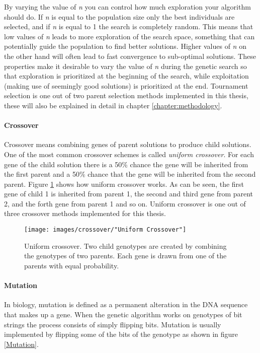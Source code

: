 \noindent By varying the value of \textit{n} you can control how much exploration your algorithm should do. If \textit{n} is equal to the population size only the best individuals are selected, and if \textit{n} is equal to 1 the search is completely random. This means that low values of \textit{n} leads to more exploration of the search space, something that can potentially guide the population to find better solutions. Higher values of \textit{n} on the other hand will often lead to fast convergence to sub-optimal solutions. These properties make it desirable to vary the value of \textit{n} during the genetic search so that exploration is prioritized at the beginning of the search, while exploitation (making use of seemingly good solutions) is prioritized at the end. Tournament selection is one out of two parent selection methods implemented in this thesis, these will also be explained in detail in chapter \ref{chapter:methodology}.\\


\paragraph*{Crossover}
Crossover means combining genes of parent solutions to produce child solutions. One of the most common crossover schemes is called \textit{uniform crossover}. For each gene of the child solution there is a 50\% chance the gene will be inherited from the first parent and a 50\% chance that the gene will be inherited from the second parent. Figure \ref{Uniform Crossover} shows how uniform crossover works. As can be seen, the first gene of child 1 is inherited from parent 1, the second and third gene from parent 2, and the forth gene from parent 1 and so on. Uniform crossover is one out of three crossover methods implemented for this thesis.


\begin{figure}[h!]
\begin{center}
\texttt{[image: images/crossover/"Uniform Crossover"]}
\caption{Uniform crossover. Two child genotypes are created by combining the genotypes of two parents. Each gene is drawn from one of the parents with equal probability.}
\label{Uniform Crossover}
\end{center}
\end{figure}


\paragraph*{Mutation}
In biology, mutation is defined as a permanent alteration in the DNA sequence that makes up a gene. When the genetic algorithm works on genotypes of bit strings the process consists of simply flipping bits. Mutation is usually implemented by flipping some of the bits of the genotype as shown in figure \ref{Mutation}. \\


